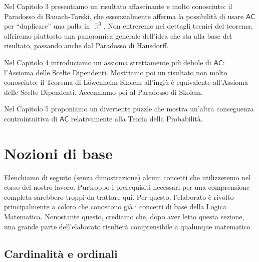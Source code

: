 \documentclass[12pt,a4paper]{report}
\theoremstyle{definition}
\theoremstyle{num.custom-title}
\DeclareMathOperator{\R}{\mathbb{R}}
\newcommand{\AC}{\ensuremath{\mathsf{AC}}\xspace}
\begin{document}
Nel Capitolo 3 presentiamo un risultato affascinante e molto conosciuto: il Paradosso di Banach-Tarski, che essenzialmente afferma la possibilità di usare \AC per ``duplicare'' una palla in $\R^3$. Non entreremo nei dettagli tecnici del teorema; offriremo piuttosto una panoramica generale dell'idea che sta alla base del risultato, passando anche dal Paradosso di Hausdorff.

Nel Capitolo 4 introduciamo un assioma strettamente più debole di \AC: l'Assioma delle Scelte Dipendenti. Mostriamo poi un risultato non molto conosciuto: il Teorema di Löwenheim-Skolem all'ingiù è equivalente all'Assioma delle Scelte Dipendenti. Accenniamo poi al Paradosso di Skolem.

Nel Capitolo 5 proponiamo un divertente puzzle che mostra un'altra conseguenza controintuitiva di \AC relativamente alla Teoria della Probabilità.






\chapter*{Nozioni di base}


\setcounter{page}{1}


Elenchiamo di seguito (senza dimostrazione) alcuni concetti che utilizzeremo nel corso del nostro lavoro. Purtroppo i prerequisiti necessari per una comprensione completa sarebbero troppi da trattare qui. Per questo, l'elaborato è rivolto principalmente a coloro che conoscono già i concetti di base della Logica Matematica. Nonostante questo, crediamo che, dopo aver letto questa sezione, una grande parte dell'elaborato risulterà comprensibile a qualunque matematico.

\section{Cardinalità e ordinali}
\end{document}
